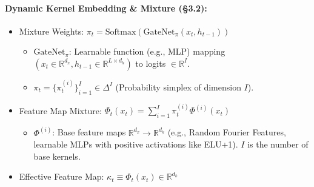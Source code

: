 \documentclass{article}
\begin{document}
\paragraph{Dynamic Kernel Embedding \& Mixture (\S3.2):}
\begin{itemize}
    \item Mixture Weights: $\pi_t = \text{Softmax}(\text{GateNet}_\pi(x_t, h_{t-1}))$
        \begin{itemize}
        \item $\text{GateNet}_\pi$: Learnable function (e.g., MLP) mapping $(x_t \in \mathbb{R}^{d_x}, h_{t-1} \in \mathbb{R}^{L \times d_h})$ to logits $\in \mathbb{R}^I$.
        \item $\pi_t = \{\pi_t^{(i)}\}_{i=1}^I \in \Delta^I$ (Probability simplex of dimension $I$).
        \end{itemize}
    \item Feature Map Mixture: $\Phi_t(x_t) = \sum_{i=1}^I \pi_t^{(i)} \Phi^{(i)}(x_t)$
        \begin{itemize}
        \item $\Phi^{(i)}$: Base feature maps $\mathbb{R}^{d_x} \to \mathbb{R}^{d_k}$ (e.g., Random Fourier Features, learnable MLPs with positive activations like ELU+1). $I$ is the number of base kernels.
        \end{itemize}
    \item Effective Feature Map: $\kappa_t \equiv \Phi_t(x_t) \in \mathbb{R}^{d_k}$
\end{itemize}
\end{document}
